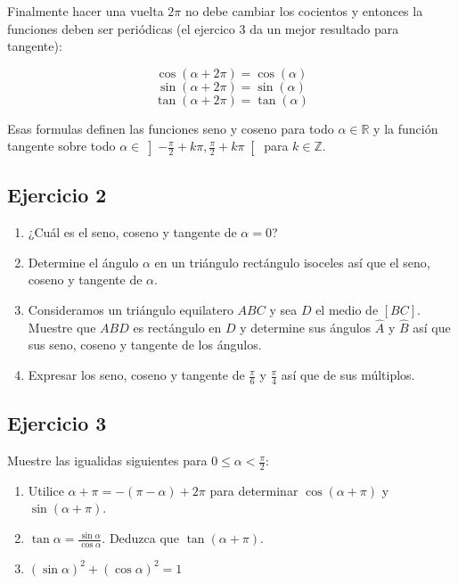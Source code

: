 Finalmente hacer una vuelta $2\pi$ no debe cambiar los cocientos y entonces
la funciones deben ser periódicas (el ejercico 3 da un mejor resultado para
tangente):

$$\cos{(\alpha+2\pi)} = \cos{(\alpha)}$$
$$\sin{(\alpha+2\pi)} = \sin{(\alpha)}$$
$$\tan{(\alpha+2\pi)} = \tan{(\alpha)}$$

Esas formulas definen las funciones seno y coseno para todo
$\alpha \in \mathbb R$ y la función tangente sobre todo
$\alpha \in \left]{-\frac{\pi}{2} + k\pi}, {\frac{\pi}{2} +k\pi} \right[$
para $k \in \mathbb Z$. 

\subsection{Ejercicio 2}

\begin{enumerate}
  \item ¿Cuál es el seno, coseno y tangente de $\alpha=0$?
  \item Determine el ángulo $\alpha$ en un triángulo rectángulo isoceles
    así que el seno, coseno y tangente de $\alpha$.
  \item Consideramos un triángulo equilatero $ABC$ y sea $D$ el medio
    de $[BC]$. Muestre que $ABD$ es rectángulo en $D$ y determine sus
    ángulos $\widehat{A}$ y $\widehat{B}$ así que sus seno, coseno y
    tangente de los ángulos.
  \item Expresar los seno, coseno y tangente de $\frac{\pi}{6}$ y
    $\frac{\pi}{4}$ así que de sus múltiplos.
\end{enumerate}

\subsection{Ejercicio 3}

Muestre las igualidas siguientes para $0 \leq \alpha < \frac{\pi}{2}$:

\begin{enumerate}
\item Utilice $\alpha + \pi = -\left(\pi-\alpha\right) + 2\pi$ para determinar
  $\cos\left(\alpha+\pi\right)$ y $\sin\left(\alpha+\pi\right)$.
\item $\tan \alpha = \frac{\sin \alpha}{\cos \alpha}$. Deduzca que 
  $\tan \left(\alpha+\pi\right)$.
\item $\left(\sin \alpha\right)^2 + \left(\cos \alpha\right)^2 = 1$
\end{enumerate}

